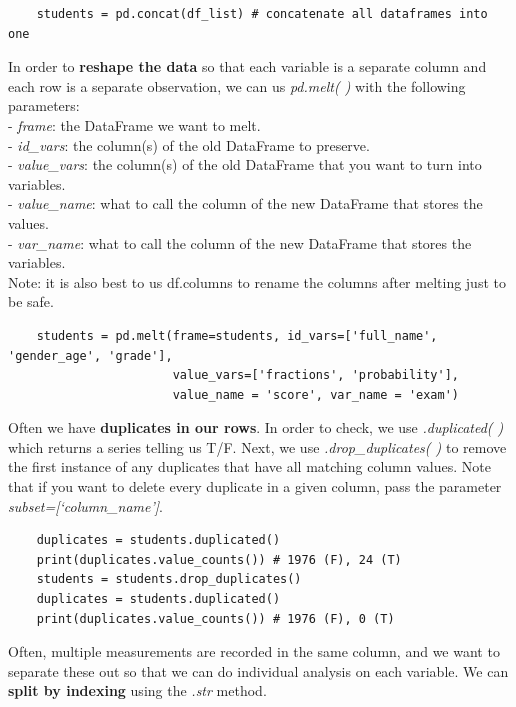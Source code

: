 \documentclass[11pt, a4paper]{article}
\begin{document}
\begin{spacing}{1.1}
\begin{lstlisting}
	students = pd.concat(df_list) # concatenate all dataframes into one \end{lstlisting}\vspace*{1mm}
	In order to \textbf{reshape the data} so that each variable is a separate column and each row is a separate observation, we can us \textit{pd.melt( )} with the following parameters: \\
	\hspace*{3mm} - \textit{frame}: the DataFrame we want to melt. \\
	\hspace*{3mm} - \textit{id\_vars}: the column(s) of the old DataFrame to preserve. \\
	\hspace*{3mm} - \textit{value\_vars}: the column(s) of the old DataFrame that you want to turn into variables. \\
	\hspace*{3mm} - \textit{value\_name}: what to call the column of the new DataFrame that stores the values. \\
	\hspace*{3mm} - \textit{var\_name}: what to call the column of the new DataFrame that stores the variables. \\
	Note: it is also best to us df.columns to rename the columns after melting just to be safe. 
	\begin{lstlisting}
	students = pd.melt(frame=students, id_vars=['full_name', 'gender_age', 'grade'], 
	                   value_vars=['fractions', 'probability'], 
	                   value_name = 'score', var_name = 'exam')	\end{lstlisting}\vspace*{1mm}
	Often we have \textbf{duplicates in our rows}. In order to check, we use \textit{.duplicated( )} which returns a series telling us T/F. Next, we use \textit{.drop\_duplicates( )} to remove the first instance of any duplicates that have all matching column values. Note that if you want to delete every duplicate in a given column, pass the parameter \textit{subset=[`column\_name']}.
	\begin{lstlisting}
	duplicates = students.duplicated() 
	print(duplicates.value_counts()) # 1976 (F), 24 (T)
	students = students.drop_duplicates()
	duplicates = students.duplicated()
	print(duplicates.value_counts()) # 1976 (F), 0 (T)	\end{lstlisting}\vspace*{1mm}
	Often, multiple measurements are recorded in the same column, and we want to separate these out so that we can do individual analysis on each variable. We can \textbf{split by indexing} using the \textit{.str} method.

\end{spacing}
\end{document}
